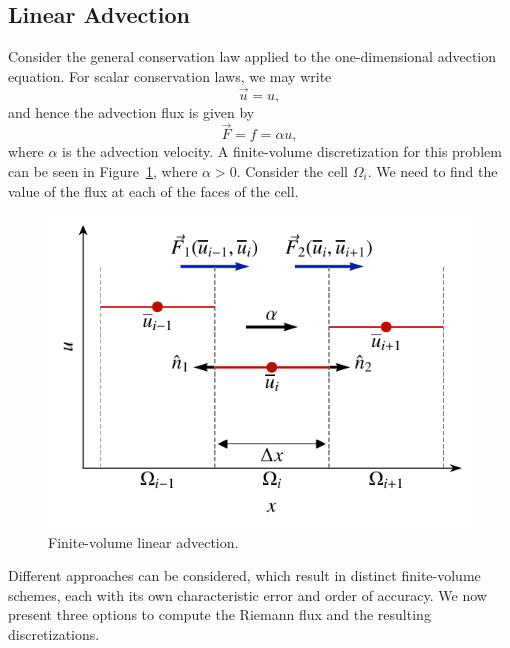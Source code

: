 \subsection{Linear Advection}
Consider the general conservation law applied to the one-dimensional advection equation. For scalar conservation laws, we may write
\begin{equation}
 \vec{u} = u,
\end{equation}
and hence the advection flux is given by
\begin{equation}
 \vec{F} = f = \alpha u,
\end{equation}
where $\alpha$ is the advection velocity. A finite-volume discretization for this problem can be seen in Figure~\ref{fig:fv_advection}, where $\alpha >0$. Consider the cell $\Omega_i$. We need to find the value of the flux at each of the faces of the cell. 
\begin{figure}[htbp]
 \centering
 \includegraphics[width=0.5\linewidth]{Pictures/ch11_fv_advection}
 \caption{Finite-volume linear advection.}
 \label{fig:fv_advection}
\end{figure}
Different approaches can be considered, which result in distinct finite-volume schemes, each with its own characteristic error and order of accuracy. We now present three options to compute the Riemann flux and the resulting discretizations.
